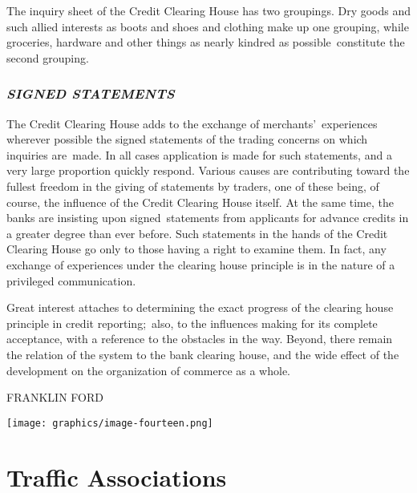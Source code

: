 \documentclass[twoside,symmetric,nobib,justified]{tufte-book}
\let\oldchapter\chapter
\def\chapter{%
  \setcounter{footnote}{0}%
  \oldchapter
}
\begin{document}
The inquiry sheet of the Credit Clearing House has two groupings. Dry
goods and such allied interests as boots and shoes and clothing make up
one grouping, while groceries, hardware and other things as nearly
kindred as possible~constitute the second grouping.~

\hypertarget{signed-statements}{%
\subsection{\texorpdfstring{\emph{SIGNED
STATEMENTS}}{SIGNED STATEMENTS}}\label{signed-statements}}

The Credit Clearing House adds to the exchange of merchants'~experiences
wherever possible the signed statements of the trading concerns on which
inquiries are~made. In all cases application is made for such
statements, and a very large proportion quickly respond. Various causes
are contributing toward the fullest freedom in the giving of statements
by traders, one of these being, of course, the influence of the Credit
Clearing House itself. At the same time, the banks are insisting upon
signed~statements from applicants for advance credits in a greater
degree than ever before. Such statements in the hands of the Credit
Clearing House go only to those having a right to examine them. In fact,
any exchange of experiences under the clearing house principle is in the
nature of a privileged communication.~

\newpage Great interest attaches to determining the exact progress of the
clearing house principle in credit reporting;~also, to the influences
making for its complete acceptance, with a reference to the obstacles in
the way. Beyond, there remain the relation of the system to the bank
clearing house, and the wide effect of the development on the
organization of commerce as a whole.~

\vspace{0.2in}

\hfill FRANKLIN FORD

\begin{figure*}
    \centering
    \texttt{[image: graphics/image-fourteen.png]}
    \label{fig:fig14}
\end{figure*}



\chapter[Traffic Associations]{Traffic Associations}
\label{ch:Traffic Associations}
\end{document}
